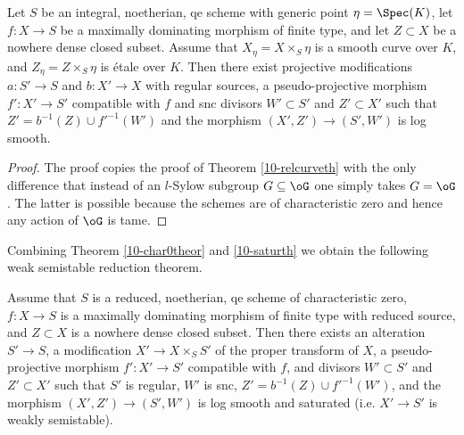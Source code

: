 \documentclass[10pt]{../fichiers-configuration-latex/smfart}
\begin{document}
\begin{lemma2}\label{10-relcurvelem}
Let $S$ be an integral, noetherian, qe scheme with generic point $\eta=\Spec(K)$,
let $f{\colon}X\to S$ be a maximally dominating morphism of finite type, and let
$Z\subset X$ be a nowhere dense closed subset. Assume that $X_\eta=X\times_S\eta$
is a smooth curve over $K$, and $Z_\eta=Z\times_S\eta$ is étale over $K$. Then
there exist projective modifications $a{\colon}S'\to S$ and $b{\colon}X'\to X$
with regular sources, a pseudo-projective morphism $f'{\colon}X'\to S'$ compatible
with $f$ and snc divisors $W'\subset S'$ and $Z'\subset X'$ such that
$Z'=b^{-1}(Z)\cup f'^{-1}(W')$ and the morphism $(X',Z')\to(S',W')$ is log smooth.
\end{lemma2}
\begin{proof}
The proof copies the proof of Theorem \ref{10-relcurveth} with the only difference
that instead of an $l$-Sylow subgroup $G\subseteq\oG$ one simply takes $G=\oG$.
The latter is possible because the schemes are of characteristic zero and hence
any action of $\oG$ is tame.
\end{proof}

Combining Theorem \ref{10-char0theor} and \ref{10-saturth} we obtain the following
weak semistable reduction theorem.

\begin{theorem}\label{10-weaksemistable}
Assume that $S$ is a reduced, noetherian, qe scheme of characteristic zero,
$f{\colon}X\to S$ is a maximally dominating morphism of finite type with
reduced source, and $Z\subset X$ is a nowhere dense closed subset. Then
there exists an alteration $S'\to S$, a modification $X'\to X\times_SS'$
of the proper transform of $X$, a pseudo-projective morphism $f'{\colon}X'\to S'$
compatible with $f$, and divisors $W'\subset S'$ and $Z'\subset X'$ such that $S'$
is regular, $W'$ is snc, $Z'=b^{-1}(Z)\cup f'^{-1}(W')$, and the morphism $(X',Z')\to(S',W')$
is log smooth and saturated (i.e. $X'\to S'$ is weakly semistable).
\end{theorem}
\end{document}
